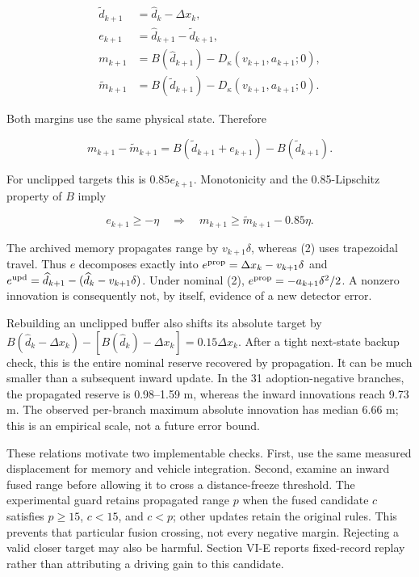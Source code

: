 \documentclass[letterpaper,journal]{IEEEtran}
\begin{document}
\[\begin{aligned}
\widetilde d_{k+1}&=\widehat d_k-\Delta x_k,\\
e_{k+1}&=\widehat d_{k+1}-\widetilde d_{k+1},\\
m_{k+1}&=B(\widehat d_{k+1})-D_\kappa(v_{k+1},a_{k+1};0),\\
\widetilde m_{k+1}&=B(\widetilde d_{k+1})-D_\kappa(v_{k+1},a_{k+1};0).
\end{aligned}\tag{12}\]

Both margins use the same physical state. Therefore

\[m_{k+1}-\widetilde m_{k+1}
=B(\widetilde d_{k+1}+e_{k+1})-B(\widetilde d_{k+1}).\tag{13}\]

For unclipped targets this is \(0.85e_{k+1}\). Monotonicity and the 0.85-Lipschitz property of \(B\) imply

\[e_{k+1}\ge-\eta\quad\Longrightarrow\quad
m_{k+1}\ge\widetilde m_{k+1}-0.85\eta.\tag{14}\]

The archived memory propagates range by \(v_{k+1}\delta\), whereas (2) uses trapezoidal travel. Thus \(e\) decomposes exactly into \(e^{\rm prop}=\Delta x_k-v_{k+1}\delta\) and \(e^{\rm upd}=\widehat d_{k+1}-(\widehat d_k-v_{k+1}\delta)\). Under nominal (2), \(e^{\rm prop}=-a_{k+1}\delta^2/2\). A nonzero innovation is consequently not, by itself, evidence of a new detector error.

Rebuilding an unclipped buffer also shifts its absolute target by \(B(\widehat d_k-\Delta x_k)-[B(\widehat d_k)-\Delta x_k]=0.15\Delta x_k\). After a tight next-state backup check, this is the entire nominal reserve recovered by propagation. It can be much smaller than a subsequent inward update. In the 31 adoption-negative branches, the propagated reserve is 0.98--1.59 m, whereas the inward innovations reach 9.73 m. The observed per-branch maximum absolute innovation has median 6.66 m; this is an empirical scale, not a future error bound.

These relations motivate two implementable checks. First, use the same measured displacement for memory and vehicle integration. Second, examine an inward fused range before allowing it to cross a distance-freeze threshold. The experimental guard retains propagated range \(p\) when the fused candidate \(c\) satisfies \(p\ge15\), \(c<15\), and \(c<p\); other updates retain the original rules. This prevents that particular fusion crossing, not every negative margin. Rejecting a valid closer target may also be harmful. Section VI-E reports fixed-record replay rather than attributing a driving gain to this candidate.
\end{document}
